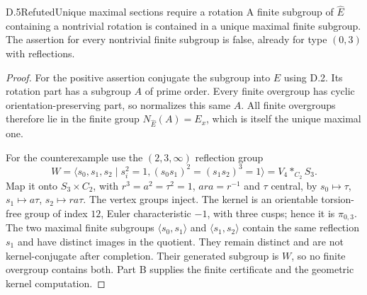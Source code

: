 \begin{claim}{D.5}{Refuted}{Unique maximal sections require a rotation}
A finite subgroup of $\widehat E$ containing a nontrivial rotation is contained in a unique maximal finite subgroup. The assertion for every nontrivial finite subgroup is false, already for type $(0,3)$ with reflections.
\end{claim}
\begin{proof}
For the positive assertion conjugate the subgroup into $E$ using D.2. Its rotation part has a subgroup $A$ of prime order. Every finite overgroup has cyclic orientation-preserving part, so normalizes this same $A$. All finite overgroups therefore lie in the finite group $N_{\widehat E}(A)=E_x$, which is itself the unique maximal one.

For the counterexample use the $(2,3,\infty)$ reflection group
\[
W=\langle s_0,s_1,s_2\mid s_i^2=1,
(s_0s_1)^2=(s_1s_2)^3=1\rangle
       = V_4*_{C_2}S_3.
\]
Map it onto $S_3\times C_2$, with $r^3=a^2=\tau^2=1$, $ara=r^{-1}$ and $\tau$ central, by
$s_0\mapsto\tau$, $s_1\mapsto a\tau$, $s_2\mapsto ra\tau$.
The vertex groups inject. The kernel is an orientable torsion-free group of index $12$, Euler characteristic $-1$, with three cusps; hence it is $\pi_{0,3}$. The two maximal finite subgroups
$\langle s_0,s_1\rangle$ and $\langle s_1,s_2\rangle$ contain the same reflection $s_1$ and have distinct images in the quotient. They remain distinct and are not kernel-conjugate after completion. Their generated subgroup is $W$, so no finite overgroup contains both. Part B supplies the finite certificate and the geometric kernel computation.
\end{proof}

